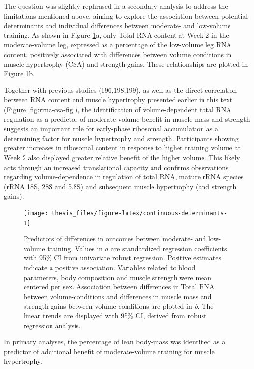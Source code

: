 \documentclass[twoside,10pt]{gihclass} %
\begin{document}
The question was slightly rephrased in a secondary analysis to address the limitations mentioned above, aiming to explore the association between potential determinants and individual differences between moderate- and low-volume training.
As shown in Figure \ref{fig:continuous-determinants}a, only Total RNA content at Week 2 in the moderate-volume leg, expressed as a percentage of the low-volume leg RNA content, positively associated with differences between volume conditions in muscle hypertrophy (CSA) and strength gains. These relationships are plotted in Figure \ref{fig:continuous-determinants}b.

Together with previous studies
(196,198,199),
as well as the direct correlation between RNA content and muscle hypertrophy presented earlier in this text
(Figure \ref{fig:rrna-csa-fig}),
the identification of volume-dependent total RNA regulation as a predictor of moderate-volume benefit in muscle mass and strength suggests an important role for early-phase ribosomal accumulation as a determining factor for muscle hypertrophy and strength.
Participants showing greater increases in ribosomal content in response to higher training volume at Week 2 also displayed greater relative benefit of the higher volume.
This likely acts through an increased translational capacity and confirms observations regarding volume-dependence in regulation of total RNA, mature rRNA species (rRNA 18S, 28S and 5.8S) and subsequent muscle hypertrophy (and strength gains).
\begin{figure}

{\centering \texttt{[image: thesis\_files/figure-latex/continuous-determinants-1]} 

}

\caption[Determinanats of moderate- over low-volume training benefit]{Predictors of differences in outcomes between moderate- and low-volume training. Values in \textit{a} are standardized regression coefficients with 95\% CI from univariate robust regression. Positive estimates indicate a positive association. Variables related to blood parameters, body composition and muscle strength were mean centered per sex. Association between differences in Total RNA between volume-conditions and differences in muscle mass and strength gains between volume-conditions are plotted in \textit{b}. The linear trends are displayed with 95\% CI, derived from robust regression analysis.}\label{fig:continuous-determinants}
\end{figure}
In primary analyses, the percentage of lean body-mass was identified as a predictor of additional benefit of moderate-volume training for muscle hypertrophy.
\end{document}
